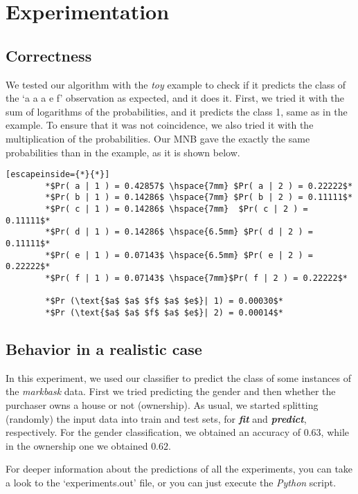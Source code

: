 \section{Experimentation}
\label{sec:experimentation}

\subsection{Correctness}
We tested our algorithm with the \textit{toy} example to check if it predicts the class of the `a a a e f' observation as expected, and it does it. First, we tried it with the sum of logarithms of the probabilities, and it predicts the class 1, same as in the example. To ensure that it was not coincidence, we also tried it with the multiplication of the probabilities. Our MNB gave the exactly the same probabilities than in the example, as it is shown below.

\begin{lstlisting}[escapeinside={*}{*}]
        *$Pr( a | 1 ) = 0.42857$ \hspace{7mm} $Pr( a | 2 ) = 0.22222$*
        *$Pr( b | 1 ) = 0.14286$ \hspace{7mm} $Pr( b | 2 ) = 0.11111$*
        *$Pr( c | 1 ) = 0.14286$ \hspace{7mm}  $Pr( c | 2 ) = 0.11111$*
        *$Pr( d | 1 ) = 0.14286$ \hspace{6.5mm} $Pr( d | 2 ) = 0.11111$*
        *$Pr( e | 1 ) = 0.07143$ \hspace{6.5mm} $Pr( e | 2 ) = 0.22222$*
        *$Pr( f | 1 ) = 0.07143$ \hspace{7mm}$Pr( f | 2 ) = 0.22222$*

        *$Pr (\text{$a$ $a$ $f$ $a$ $e$}| 1) = 0.00030$*
        *$Pr (\text{$a$ $a$ $f$ $a$ $e$}| 2) = 0.00014$*
\end{lstlisting}

\subsection{Behavior in a realistic case}
In this experiment, we used our classifier to predict the class of some instances of the \textit{markbask} data. First we tried predicting the gender and then whether the purchaser owns a house or not (ownership). As usual, we started splitting (randomly) the input data into train and test sets, for \textbf{\textit{fit}} and \textbf{\textit{predict}}, respectively.
For the gender classification, we obtained an accuracy of $0.63$, while in the ownership one we obtained $0.62$.

For deeper information about the predictions of all the experiments, you can take a look to the `experiments.out' file, or you can just execute the \textit{Python} script.

